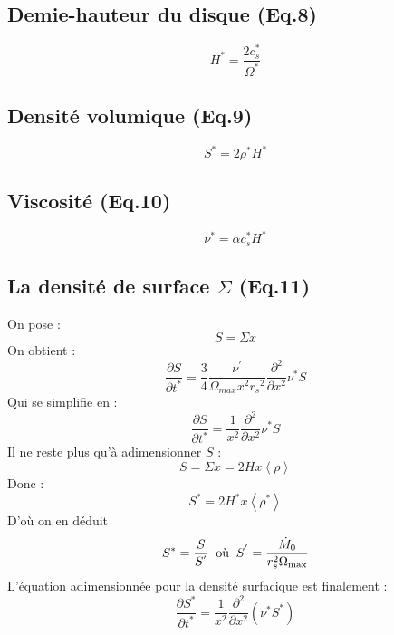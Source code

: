 \documentclass[a4paper,11pt]{article}
\begin{document}
\subsection{Demie-hauteur du disque (Eq.8)}
    \begin{equation}\label{demie_hauteur}
        H^* = \frac{2 c_s^*}{\Omega^*}
    \end{equation}
    
\subsection{Densité volumique (Eq.9)}
    \begin{equation}\label{densite_volumique}
        S^* = 2 \rho^* H^*
    \end{equation}
    
\subsection{Viscosité (Eq.10)}
    \begin{equation}\label{viscosite}
        \nu^* = \alpha c_s^* H^*
    \end{equation}
    
\subsection{La densité de surface $\Sigma$ (Eq.11)}
On pose :
\begin{equation}
S=\Sigma x
\end{equation}
On obtient : 
\begin{equation}
\frac{\partial S}{\partial t^*}=\frac{3}{4}\frac{\nu^{'}}{\Omega_{max}x^2{r_s}^2}\frac{\partial^2}{\partial x^2}\nu^*S
\end{equation}
Qui se simplifie en :
\begin{equation}
\frac{\partial S}{\partial t^*}=\frac{1}{x^2}\frac{\partial^2}{\partial x^2}\nu^*S
\end{equation}
Il ne reste plus qu'à adimensionner $S$ :
\begin{equation}
S=\Sigma x=2Hx \left \langle \rho \right \rangle
\end{equation}
Donc : 
\begin{equation}
S^*=2H^*x \left \langle \rho^* \right \rangle
\end{equation}
D'où on en déduit
\begin{equation}
    S^* = \frac{S}{S^{'}} \;\; \textrm{où} \;\; S^{'} = \frac{\dot{M}_0}{r_s^2 \Omega_{\rm{max}}}
\end{equation}
L'équation adimensionnée pour la densité surfacique est finalement : 
\begin{equation}\label{densite_surfacique}
\frac{\partial S^*}{\partial t^*}=\frac{1}{x^2}\frac{\partial^2}{\partial x^2}(\nu^*S^*)
\end{equation}
\end{document}
